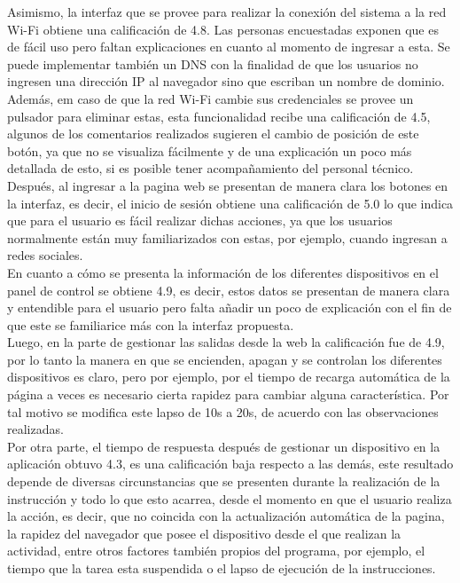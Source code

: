 Asimismo, la interfaz que se provee para realizar la conexión del sistema a la red Wi-Fi obtiene una calificación de 4.8. Las personas encuestadas exponen que es de fácil uso pero faltan explicaciones en cuanto al momento de ingresar a esta. Se puede implementar también un DNS con la finalidad de que los usuarios no ingresen una dirección IP al navegador sino que escriban un nombre de dominio.\\

Además, em caso de que la red Wi-Fi cambie sus credenciales se provee un pulsador para eliminar estas, esta funcionalidad recibe una calificación de 4.5, algunos de los comentarios realizados sugieren el cambio de posición de este botón, ya que no se visualiza fácilmente y de una explicación un poco más detallada de esto, si es posible tener acompañamiento del personal técnico.\\

Después, al ingresar a la pagina web se presentan de manera clara los botones en la interfaz, es decir, el inicio de sesión obtiene una calificación de 5.0 lo que indica que para el usuario es fácil realizar dichas acciones, ya que los usuarios normalmente están muy familiarizados con estas, por ejemplo, cuando ingresan a redes sociales.\\

En cuanto a cómo se presenta la información de los diferentes dispositivos en el panel de control se obtiene 4.9, es decir, estos datos se presentan de manera clara y entendible para el usuario pero falta añadir un poco de explicación con el fin de que este se familiarice más con la interfaz propuesta.\\

Luego, en la parte de gestionar las salidas desde la web la calificación fue de 4.9, por lo tanto la manera en que se encienden, apagan y se controlan los diferentes dispositivos es claro, pero por ejemplo, por el tiempo de recarga automática de la página a veces es necesario cierta rapidez para cambiar alguna característica. Por tal motivo se modifica este lapso de 10s a 20s, de acuerdo con las observaciones realizadas.\\

Por otra parte, el tiempo de respuesta después de gestionar un dispositivo en la aplicación obtuvo 4.3, es una calificación baja respecto a las demás, este resultado depende de diversas circunstancias que se presenten durante la realización de la instrucción y todo lo que esto acarrea, desde el momento en que el usuario realiza la acción, es decir, que no coincida con la actualización automática de la pagina, la rapidez del navegador que posee el dispositivo desde el que realizan la actividad, entre otros factores también propios del programa, por ejemplo, el tiempo que la tarea esta suspendida o el lapso de ejecución de la instrucciones.\\

